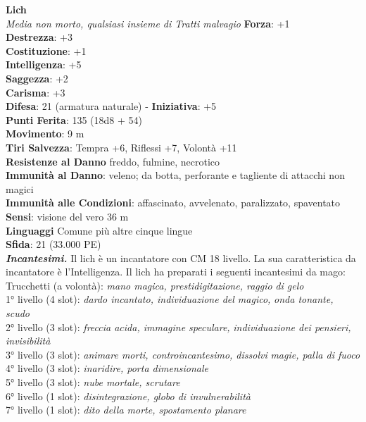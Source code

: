 \begin{multicols}{2}
\medskip\textbf{Lich}\\
\emph{Media non morto, qualsiasi insieme di Tratti malvagio}
\textbf{Forza}: +1\\
\textbf{Destrezza}: +3\\
\textbf{Costituzione}: +1\\
\textbf{Intelligenza}: +5\\
\textbf{Saggezza}: +2\\
\textbf{Carisma}: +3\\
\textbf{Difesa}: 21 (armatura naturale) - \textbf{Iniziativa}: +5\\
\textbf{Punti Ferita}: 135 (18d8 + 54)\\
\textbf{Movimento}: 9 m\\
\textbf{Tiri Salvezza}: Tempra +6, Riflessi +7, Volontà +11\\
\textbf{Resistenze al Danno} freddo, fulmine, necrotico\\
\textbf{Immunità al Danno}: veleno; da botta, perforante e tagliente di attacchi non magici\\
\textbf{Immunità alle Condizioni}: affascinato, avvelenato, paralizzato, spaventato\\
\textbf{Sensi}: visione del vero 36 m\\
\textbf{Linguaggi} Comune più altre cinque lingue\\
\textbf{Sfida}: 21 (33.000 PE)\smallskip\\
\emph{\textbf{Incantesimi.}} Il lich è un incantatore con CM 18 livello. La sua caratteristica da incantatore è l'Intelligenza. Il lich ha preparati i seguenti incantesimi da mago:\\
Trucchetti (a volontà): \emph{mano magica, prestidigitazione, raggio} \emph{di gelo}\\
1° livello (4 slot): \emph{dardo incantato, individuazione del magico,} \emph{onda tonante, scudo}\\
2° livello (3 slot): \emph{freccia acida, immagine speculare,} \emph{individuazione dei pensieri, invisibilità}\\
3° livello (3 slot): \emph{animare morti, controincantesimo, dissolvi} \emph{magie, palla di fuoco}\\
4° livello (3 slot): \emph{inaridire, porta dimensionale}\\
5° livello (3 slot): \emph{nube mortale, scrutare}\\
6° livello (1 slot): \emph{disintegrazione, globo di invulnerabilità}\\
7° livello (1 slot): \emph{dito della morte, spostamento planare}\\

\end{multicols}
